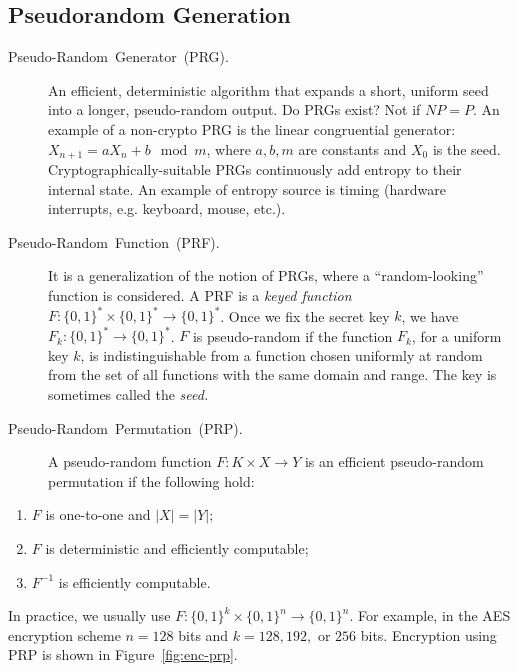 \documentclass[10pt]{article}
\theoremstyle{plain}
\begin{document}
\subsection{Pseudorandom Generation}
\begin{description}
	\item [{Pseudo-Random~Generator~(PRG).}] An efficient, deterministic
	algorithm that expands a short, uniform seed into a longer, pseudo-random
	output. Do PRGs exist? Not if $NP=P$. An example of a non-crypto
	PRG is the linear congruential generator: $X_{n+1}=aX_{n}+b\mod m$,
	where $a,b,m$ are constants and $X_{0}$ is the seed. Cryptographically-suitable
	PRGs continuously add entropy to their internal state. An example
	of entropy source is timing (hardware interrupts, e.g. keyboard, mouse,
	etc.).
	\item [{Pseudo-Random~Function~(PRF).}] It is a generalization of the
	notion of PRGs, where a \textquotedblleft random-looking\textquotedblright{}
	function is considered. A PRF is a \emph{keyed function} $F:\{0,1\}^{*}\times\{0,1\}^{*}\to\{0,1\}^{*}$.
	Once we fix the secret key $k$, we have $F_{k}:\{0,1\}^{*}\to\{0,1\}^{*}$.
	$F$ is pseudo-random if the function $F_{k}$, for a uniform key
	$k$, is indistinguishable from a function chosen uniformly at random
	from the set of all functions with the same domain and range. The
	key is sometimes called the \emph{seed.}
	\item [{Pseudo-Random~Permutation~(PRP).}] A pseudo-random function $F:K\times X\to Y$
	is an efficient pseudo-random permutation if the following hold:
\end{description}
\begin{enumerate}
	\item $F$ is one-to-one and $|X|=|Y|;$
	\item $F$ is deterministic and efficiently computable;
	\item $F^{-1}$ is efficiently computable.
\end{enumerate}
In practice, we usually use $F:\{0,1\}^{k}\times\{0,1\}^{n}\to\{0,1\}^{n}$.
For example, in the AES encryption scheme $n=128$ bits and $k=128,192,$
or $256$ bits. Encryption using PRP is shown in Figure~\ref{fig:enc-prp}.
\end{document}
